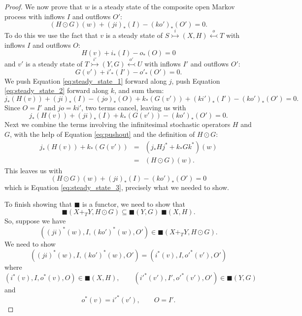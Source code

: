 \documentclass[oneside,final]{ucr}
\theoremstyle{definition}
\begin{document}
{\begin{proof}
We now prove that $w$ is a steady state of the composite open Markov process with
inflows $I$ and outflows $O'$:
\begin{equation}
   \label{eq:steady_state_3}
   (H \odot G)(w) + (ji)_*(I) - (ko')_*(O') = 0.
\end{equation}
To do this we use the fact that $v$ is a steady state of $S \stackrel{i}\rightarrowtail (X,H) \stackrel{o}\leftarrowtail T$ with inflows $I$ and outflows $O$:
\begin{equation}\label{eq:steady_state_1}
   H(v) + i_*(I) - o_*(O) = 0
\end{equation}
and $v'$ is a steady state of $T \stackrel{i'}\rightarrowtail (Y,G) \stackrel{o'}\leftarrowtail U$ with inflows $I'$ and outflows $O'$:
\begin{equation}\label{eq:steady_state_2}
   G(v') + i'_*(I') - o'_*(O') = 0.
\end{equation}
We push Equation \eqref{eq:steady_state_1} forward along $j$, push Equation \eqref{eq:steady_state_2} forward along $k$, and sum them:
\[   j_*(H(v))  + (ji)_*(I) - (jo)_*(O) + k_*(G(v')) + (ki')_*(I') - (ko')_*(O') = 0. \]
Since $O = I'$ and $jo = ki'$, two terms cancel, leaving us with
\[     j_*(H(v))  + (ji)_*(I) + k_*(G(v')) - (ko')_*(O') = 0. \]
Next we combine the terms involving the infinitesimal stochastic operators $H$ and $G$, with the help of Equation \eqref{eq:pushout} and the definition of $H \odot G$:
\begin{equation}
\label{eq:u}
   \begin{array}{ccl}
  j_*(H(v)) + k_*(G(v')) &=& (j_* H j^* + k_* G k^*)(w) \\
                                    &=& (H \odot G)(w)  .
\end{array}
\end{equation}
This leaves us with
\[         (H \odot G)(w) +  (ji)_*(I) - (ko')_*(O') = 0 \]
which is Equation \eqref{eq:steady_state_3}, precisely what we needed to show.

To finish showing that $\blacksquare$ is a functor, we need to show that 
\[   \blacksquare(X+_T Y,H \odot G) \subseteq \blacksquare(Y,G) \; \blacksquare(X,H)  .\] 
So, suppose we have 
\[    ((ji)^*(w), I, {(ko')}^*(w), O') \in \blacksquare(X+_T Y,H \odot G) .\]
We need to show
\begin{equation}
\label{eq:composite}
  ((ji)^*(w), I, {(ko')}^*(w), O') = (i^*(v),I,o'^*(v'),O')
\end{equation}
where 
\[     (i^*(v),I,o^*(v),O) \in \blacksquare(X,H), \qquad  (i'^*(v'),I',o'^*(v'),O') \in \blacksquare(Y,G) \]
and
\[   o^*(v) = i'^*(v'), \qquad O = I' .\]


\end{proof}}
\end{document}
